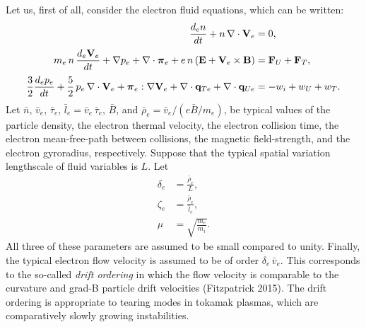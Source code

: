 \documentclass[notitlepage,12pt]{article}
\newcommand{\bpi}{\mbox{\boldmath$\pi$}}
\begin{document}
Let us, first of all, consider the electron fluid equations, which can
be written:
\begin{align}
\frac{d_e n}{dt} + n\,\nabla\cdot{\bf V}_e &= 0,\\[0.5ex]
m_e\, n\,\frac{d_e {\bf V}_e}{dt} + \nabla p_e+ \nabla\cdot \bpi_e + e\, n\,
({\bf E} + {\bf V}_e\times {\bf B})& = {\bf F}_U +{\bf F}_T,\\[0.5ex]
\frac{3}{2}\frac{d_e p_e}{dt} + \frac{5}{2}\,p_e\,\nabla\cdot{\bf V}_e
+ \bpi_e:\nabla{\bf V}_e+ \nabla\cdot{\bf q}_{Te} 
+ \nabla\cdot{\bf q}_{Ue} &= -w_i+w_U + w_T.
\end{align}
Let $\bar{n}$, $\bar{v}_e$, $\bar{\tau}_e$, $\bar{l}_e=\bar{v}_e\,\bar{\tau}_e$, $\bar{B}$,
and $\bar{\rho}_e =\bar{ v}_e/(e\bar{B}/m_e)$,  be typical values
of the particle density, the electron thermal velocity, the electron collision time, the electron
mean-free-path between collisions,  the magnetic field-strength, and the
electron gyroradius,  respectively. 
Suppose that the typical spatial variation lengthscale of fluid variables is $L$. Let
 \begin{align}
\delta_e &=\frac{\bar{\rho}_e}{L},\\[0.5ex]
\zeta_e &= \frac{\bar{\rho}_e}{\bar{l}_e},\\[0.5ex]
\mu &= \sqrt{\frac{m_e}{m_i}}.
\end{align}
All three of these parameters are assumed to be  small
compared to unity. Finally, the typical electron flow velocity is assumed to be of order $\delta_e\,\bar{v}_e$. This corresponds
to the so-called {\em drift ordering}\/ in which the flow velocity is comparable to the curvature and grad-B particle
drift velocities (Fitzpatrick 2015). The drift ordering is appropriate to tearing modes in tokamak plasmas, which are comparatively
slowly growing instabilities. 
\end{document}
